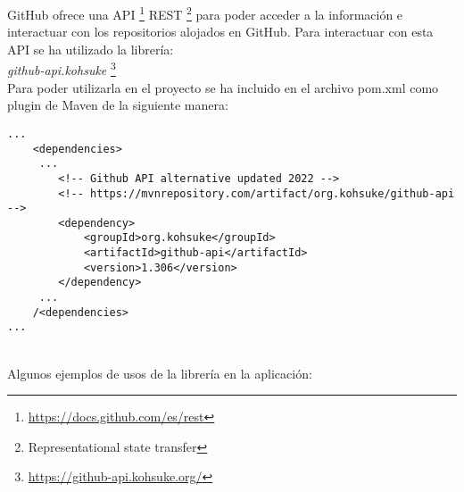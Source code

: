 GitHub ofrece una API \footnote{\url{https://docs.github.com/es/rest}} REST \footnote{Representational state transfer} para poder acceder a la información e interactuar con los repositorios alojados en GitHub. Para interactuar con esta API se ha utilizado la librería:\\

\textit{github-api.kohsuke} \footnote{\url{https://github-api.kohsuke.org/}}\\
Para poder utilizarla en el proyecto se ha incluido en el archivo pom.xml como plugin de Maven de la siguiente manera:

\begin{minipage}{\linewidth}
{\tiny
\begin{verbatim}
...
	<dependencies>
	 ...
		<!-- Github API alternative updated 2022 -->
		<!-- https://mvnrepository.com/artifact/org.kohsuke/github-api -->
		<dependency>
			<groupId>org.kohsuke</groupId>
			<artifactId>github-api</artifactId>
			<version>1.306</version>
		</dependency>
	 ...
	/<dependencies>
...
\end{verbatim}
}
\end{minipage}\\

\newpage
Algunos ejemplos de usos de la librería en la aplicación:

